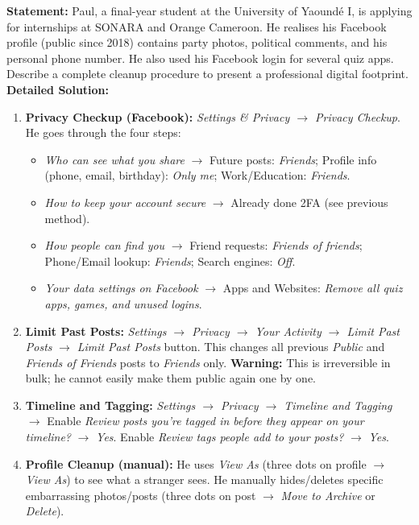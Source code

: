 \documentclass[11pt]{article}
\begin{document}
\begin{exoresolu}
    \textbf{Statement:} Paul, a final-year student at the University of Yaoundé I, is applying for internships at SONARA and Orange Cameroon. He realises his Facebook profile (public since 2018) contains party photos, political comments, and his personal phone number. He also used his Facebook login for several quiz apps. Describe a complete cleanup procedure to present a professional digital footprint.
    \tcblower
    \textbf{Detailed Solution:}
    \begin{enumerate}
        \item \textbf{Privacy Checkup (Facebook):} \textit{Settings \& Privacy $\rightarrow$ Privacy Checkup}. He goes through the four steps:
              \begin{itemize}
                  \item \textit{Who can see what you share} $\rightarrow$ Future posts: \textit{Friends}; Profile info (phone, email, birthday): \textit{Only me}; Work/Education: \textit{Friends}.
                  \item \textit{How to keep your account secure} $\rightarrow$ Already done 2FA (see previous method).
                  \item \textit{How people can find you} $\rightarrow$ Friend requests: \textit{Friends of friends}; Phone/Email lookup: \textit{Friends}; Search engines: \textit{Off}.
                  \item \textit{Your data settings on Facebook} $\rightarrow$ Apps and Websites: \textit{Remove all quiz apps, games, and unused logins}.
              \end{itemize}
        \item \textbf{Limit Past Posts:} \textit{Settings $\rightarrow$ Privacy $\rightarrow$ Your Activity $\rightarrow$ Limit Past Posts} $\rightarrow$ \textit{Limit Past Posts} button. This changes all previous \textit{Public} and \textit{Friends of Friends} posts to \textit{Friends} only. \textbf{Warning:} This is irreversible in bulk; he cannot easily make them public again one by one.
        \item \textbf{Timeline and Tagging:} \textit{Settings $\rightarrow$ Privacy $\rightarrow$ Timeline and Tagging} $\rightarrow$ Enable \textit{Review posts you're tagged in before they appear on your timeline?} $\rightarrow$ \textit{Yes}. Enable \textit{Review tags people add to your posts?} $\rightarrow$ \textit{Yes}.
        \item \textbf{Profile Cleanup (manual):} He uses \textit{View As} (three dots on profile $\rightarrow$ \textit{View As}) to see what a stranger sees. He manually hides/deletes specific embarrassing photos/posts (three dots on post $\rightarrow$ \textit{Move to Archive} or \textit{Delete}).

\end{enumerate}
\end{exoresolu}
\end{document}
